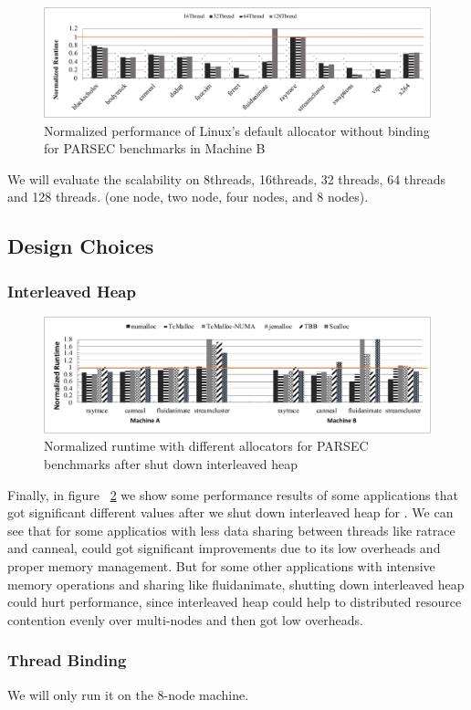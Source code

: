 \begin{figure}[!ht]
    \centering
    \includegraphics[width=\textwidth]{figure/scalobility-pthread.pdf}
    \caption{Normalized performance of Linux's default allocator without binding for PARSEC benchmarks in Machine B}
    \label{pthread-scalibity}
\end{figure}
We will evaluate the scalability on 8threads, 16threads, 32 threads, 64 threads and 128 threads. 
(one node, two node, four nodes, and 8 nodes). 

\subsection{Design Choices}
\label{sec:design}

\subsubsection{Interleaved Heap} 
\label{sec:interleavedheap}

\begin{figure}[H]
    \centering
    \includegraphics[width=\textwidth]{figure/no-interleaved.pdf}
    \caption{Normalized runtime with different allocators for PARSEC benchmarks after shut down interleaved heap}
    \label{parsec-no-interleaved-perf}
\end{figure}

Finally, in figure ~\ref{parsec-no-interleaved-perf} we show some performance results of some applications that got significant different values after we shut down interleaved heap for \NM{}. We can see that for some applicatios with less data sharing between threads like ratrace and canneal, \NM{} could got significant improvements due to its low overheads and proper memory management. But for some other applications with intensive memory operations and sharing like fluidanimate, shutting down interleaved heap could hurt performance, since interleaved heap could help to distributed resource contention evenly over multi-nodes and then got low overheads.

\subsubsection{Thread Binding}
\label{sec: threadbinding}
We will only run it on the 8-node machine. 

